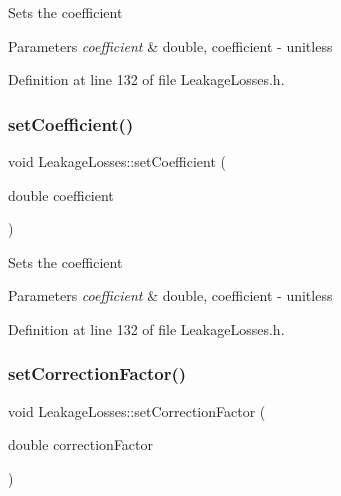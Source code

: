 Sets the coefficient 
\begin{DoxyParams}{Parameters}
{\em coefficient} & double, coefficient -\/ unitless \\
\hline
\end{DoxyParams}


Definition at line 132 of file Leakage\+Losses.\+h.

\mbox{\label{class_leakage_losses_add2e96e75b6dd965370340dc03717434}} 
\subsubsection{\texorpdfstring{set\+Coefficient()}{setCoefficient()}\hspace{0.1cm}{\footnotesize\ttfamily [3/3]}}
{\footnotesize\ttfamily void Leakage\+Losses\+::set\+Coefficient (\begin{DoxyParamCaption}\item[{double}]{coefficient }\end{DoxyParamCaption})\hspace{0.3cm}{\ttfamily [inline]}}

Sets the coefficient 
\begin{DoxyParams}{Parameters}
{\em coefficient} & double, coefficient -\/ unitless \\
\hline
\end{DoxyParams}


Definition at line 132 of file Leakage\+Losses.\+h.

\mbox{\label{class_leakage_losses_a1af53750d5d9573dffa8674b3479e8d6}} 
\subsubsection{\texorpdfstring{set\+Correction\+Factor()}{setCorrectionFactor()}\hspace{0.1cm}{\footnotesize\ttfamily [1/3]}}
{\footnotesize\ttfamily void Leakage\+Losses\+::set\+Correction\+Factor (\begin{DoxyParamCaption}\item[{double}]{correction\+Factor }\end{DoxyParamCaption})\hspace{0.3cm}{\ttfamily [inline]}}

